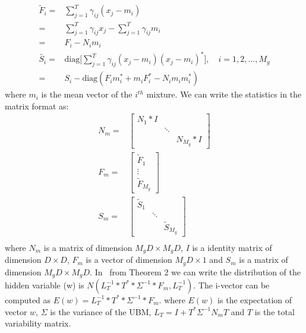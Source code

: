 \begin{spacing}{1.5}
\begin{equation}
    \begin{aligned}
     \tilde{F}_{i}=&\sum_{j=1}^{T}\gamma_{ij}(x_{j}-m_{i}) \\
        =&\sum_{j=1}^{T}\gamma_{ij}x_{j}-\sum_{j=1}^{T}\gamma_{ij}m_{i}\\
        =&F_{i} - N_{i}m_{i}\\
     \tilde{S_{i}}=&\mbox{diag}\Bigg[\sum_{j=1}^{T}\gamma_{ij}(x_{j}-m_{i})(x_{j}-m_{i})^{*}\Bigg], \quad i=1,2,\ldots,M_{g}\\
     =& S_{i}-\mbox{diag}(F_{i}m_{i}^{*}+m_{i}F_{i}^{*}-N_{i}m_{i}m_{i}^{*})
    \end{aligned}
\end{equation}
where $m_{i}$ is the mean vector of the $i^{th}$ mixture. We can write the statistics in the matrix format as:
\begin{equation}
    \begin{aligned}
     N_{m}=&\begin{bmatrix} 
        N_{1}*I &     &                 \\
                &\ddots&                \\
                &       & N_{M_{g}}*I 
        \end{bmatrix}\\
    F_{m}=&\begin{bmatrix}
            \tilde{F}_{1}\\
            \vdots      \\
            \tilde{F}_{M_{g}}
            \end{bmatrix}\\
    S_{m}=&\begin{bmatrix} 
        \tilde{S}_{1} &     &                 \\
                &\ddots&                \\
                &       & \tilde{S}_{M_{g}} 
        \end{bmatrix}\\        
    \end{aligned}
\end{equation}
where $N_{m}$ is a matrix of dimension $M_{g}D \times M_{g}D$, $I$ is a identity matrix of dimension $D \times D$, $F_{m}$ is a  vector of dimension $M_{g}D \times 1$ and $S_{m}$ is a matrix of dimension $M_{g}D \times M_{g}D$. In~\cite{kenny2005joint} from Theorem 2 we can write the distribution of the hidden variable (w) is $N(L_{T}^{-1}*T^{*}*\Sigma^{-1}*F_{m},L_{T}^{-1})$. The i-vector can be computed as $E(w)=L_{T}^{-1}*T^{*}*\Sigma^{-1}*F_{m}$. where $E(w)$ is the expectation of vector $w$, $\Sigma$ is the variance of the UBM, $L_{T}= I+T^{*}\Sigma^{-1}N_{m}T$ and $T$ is the total variability matrix.


\end{spacing}
